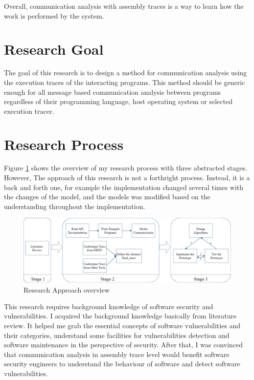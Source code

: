 Overall, communication analysis with assembly traces is a way to learn how the work is performed by the system. 

\section{Research Goal}
The goal of this research is to design a method for communication analysis using the execution traces of the interacting programs. This method should be generic enough for all message based communication analysis between programs regardless of their programming language, host operating system or selected execution tracer. 

\section{Research Process}
Figure \ref{methodology} shows the overview of my research process with three abstracted stages. However, The approach of this research is not a forthright process. Instead, it is a back and forth one, for example the implementation changed several times with the changes of the model, and the models was modified based on the understanding throughout the implementation. 

\begin{figure}[H]
  \centerline{\includegraphics[scale=0.45]{Figures/methodology}}
  \caption{Research Approach overview}
  \label{methodology}
  \end{figure}

This research requires background knowledge of software security and vulnerabilities. I acquired the background knowledge basically from literature review. It helped me grab the essential concepts of software vulnerabilities and their categories, understand some facilities for vulnerabilities detection and software maintenance in the perspective of security. After that, I was convinced that communication analysis in assembly trace level would benefit software security engineers to understand the behaviour of software and detect software vulnerabilities. 


